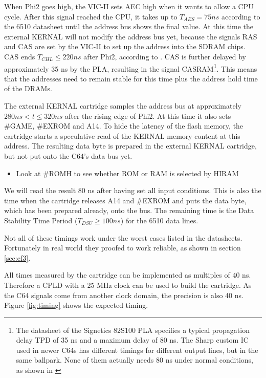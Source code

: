 \documentclass[a4paper,oneside]{memoir}
\begin{document}
When Phi2 goes high, the VIC-II sets AEC high when it wants to allow a
CPU cycle. After this signal reached the CPU, it takes up to $T_{AES} =
75 ns$ according to the 6510 datasheet until the address bus shows
the final value. 
At this time the external KERNAL will not modify the address bus yet, 
because the signals RAS and CAS are set by the VIC-II to set up the address into the SDRAM chips.
CAS ends $T_{CHL} \le 220 ns$ after Phi2, according to \cite{VICII}.
CAS is further delayed by approximately 35 ns by the PLA, resulting in the signal CASRAM\footnote{The datasheet of the Signetics 82S100 PLA \cite{Si75} specifies a typical
propagation delay TPD of 35 ns and a maximum delay of 80 ns. The
Sharp custom IC used in newer C64s has different timings for
different output lines, but in the same ballpark. None of them actually needs 80 ns under normal conditions, as shown in \cite{PLA12}}.
This means that the addresses need to remain stable for this time plus the address hold time of the DRAMs. 

The external KERNAL cartridge samples the address bus at approximately $280 ns < t \le 320 ns$ after the rising edge of Phi2.
At this time it also sets \#GAME, \#EXROM and A14.
To hide the latency of the flash memory, the cartridge starts a speculative read of the KERNAL memory content at this address.
The resulting data byte is prepared in the external KERNAL cartridge, but not put onto the C64's data bus yet.

\begin{itemize}
\item Look at \#ROMH to see whether ROM or RAM is selected by HIRAM
\end{itemize}

We will read the result 80 ns after having set all input conditions.
This is also the time when the cartridge releases A14 and \#EXROM and puts the data byte, which has been prepared already, onto the bus.
The remaining time is the Data Stability Time Period ($T_{DSU} \ge 100 ns$) for the 6510 data lines. 

Not all of these timings work under the worst cases listed in the datasheets.
Fortunately in real world they proofed to work reliable, as shown in section \ref{sec:ef3}.

All times measured by the cartridge can be implemented as multiples of 40 ns.
Therefore a CPLD with a 25 MHz clock can be used to build the cartridge.
As the C64 signals come from another clock domain, the precision is also 40 ns.
Figure \ref {fig:timing} shows the expected timing.
\end{document}
